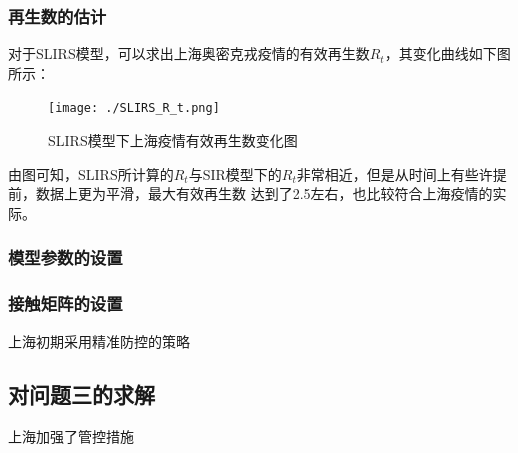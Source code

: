 \documentclass[bwprint]{gmcmthesis}
\numberwithin{figure}{section}
\begin{document}
\subsubsection{再生数的估计}
\par 对于SLIRS模型，可以求出上海奥密克戎疫情的有效再生数$R_t$，其变化曲线如下图所示：
\begin{figure}[!h]
  \centering
  \texttt{[image: ./SLIRS\_R\_t.png]}
  \caption{SLIRS模型下上海疫情有效再生数变化图}
  \label{fig1}
\end{figure}
\par 由图可知，SLIRS所计算的$R_t$与SIR模型下的$R_t$非常相近，但是从时间上有些许提前，数据上更为平滑，最大有效再生数
达到了2.5左右，也比较符合上海疫情的实际。

\subsubsection{模型参数的设置}
\subsubsection{接触矩阵的设置}
上海初期采用精准防控的策略
\subsection{对问题三的求解}
上海加强了管控措施
\end{document}

